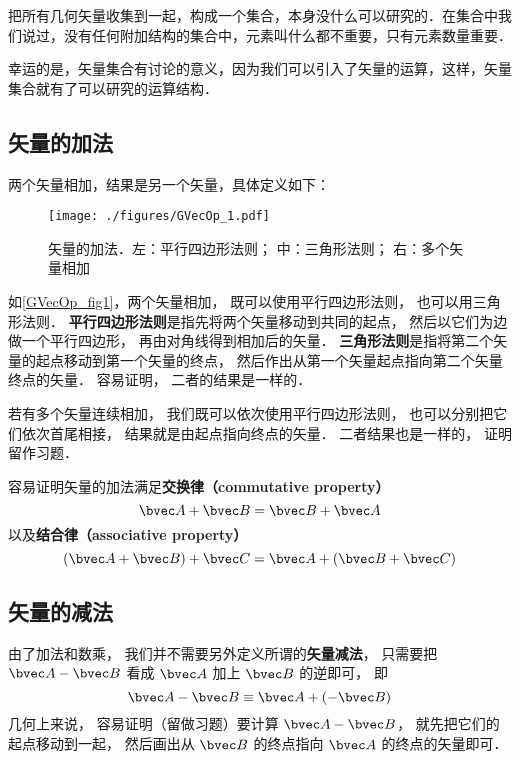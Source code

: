 

把所有几何矢量收集到一起，构成一个集合，本身没什么可以研究的．在集合中我们说过，没有任何附加结构的集合中，元素叫什么都不重要，只有元素数量重要．

幸运的是，矢量集合有讨论的意义，因为我们可以引入了矢量的运算，这样，矢量集合就有了可以研究的运算结构．

\subsection{矢量的加法}
两个矢量相加，结果是另一个矢量，具体定义如下：
\begin{figure}[ht]
\centering
\texttt{[image: ./figures/GVecOp\_1.pdf]}
\caption{矢量的加法．左：平行四边形法则； 中：三角形法则； 右：多个矢量相加} \label{GVecOp_fig1}
\end{figure}
如\autoref{GVecOp_fig1}，两个矢量相加， 既可以使用平行四边形法则， 也可以用三角形法则． \textbf{平行四边形法则}是指先将两个矢量移动到共同的起点， 然后以它们为边做一个平行四边形， 再由对角线得到相加后的矢量． \textbf{三角形法则}是指将第二个矢量的起点移动到第一个矢量的终点， 然后作出从第一个矢量起点指向第二个矢量终点的矢量． 容易证明， 二者的结果是一样的．

若有多个矢量连续相加， 我们既可以依次使用平行四边形法则， 也可以分别把它们依次首尾相接， 结果就是由起点指向终点的矢量． 二者结果也是一样的， 证明留作习题．

容易证明矢量的加法满足\textbf{交换律（commutative property）}
\begin{equation}
\bvec A + \bvec B = \bvec B + \bvec A
\end{equation}
以及\textbf{结合律（associative property）}
\begin{equation}
(\bvec A + \bvec B) + \bvec C = \bvec A + (\bvec B + \bvec C)
\end{equation}

\subsection{矢量的减法}
由了加法和数乘， 我们并不需要另外定义所谓的\textbf{矢量减法}， 只需要把 $\bvec A - \bvec B$ 看成 $\bvec A$ 加上 $\bvec B$ 的逆即可， 即
\begin{equation}
\bvec A - \bvec B \equiv \bvec A + (-\bvec B)
\end{equation}
几何上来说， 容易证明（留做习题）要计算 $\bvec A - \bvec B$， 就先把它们的起点移动到一起， 然后画出从 $\bvec B$ 的终点指向 $\bvec A$ 的终点的矢量即可．

